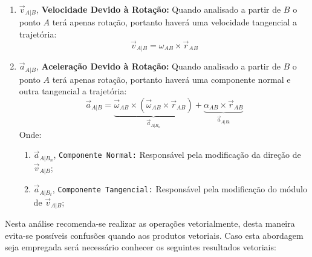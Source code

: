 \documentclass{article}
\begin{document}
                \begin{enumerate}[rightmargin = \leftmargin, noitemsep]
                    \item $\vec{v}_{A|B}$, \textbf{Velocidade Devido à Rotação:} Quando analisado a partir de $B$ o ponto $A$ terá apenas rotação, portanto haverá uma velocidade tangencial a trajetória:
                        \begin{equation}
                            \boxed{
                                \vec{v}_{A|B} = \omega_{AB}\times\vec{r}_{AB}
                            }
                        \end{equation}

                    \item $\vec{a}_{A|B}$, \textbf{Aceleração Devido à Rotação:} Quando analisado a partir de $B$ o ponto $A$ terá apenas rotação, portanto haverá uma componente normal e outra tangencial a trajetória:
                        \begin{equation}
                            \boxed{
                                \vec{a}_{A|B} = 
                                \underbrace{
                                    \vec{\omega}_{AB}\times(\vec{\omega}_{AB}\times\vec{r}_{AB})
                                }_{\vec{a}_{A|B_{n}}} + 
                                \underbrace{
                                    \alpha_{AB}\times\vec{r}_{AB}
                                }_{\vec{a}_{A|B_{t}}}
                            }
                        \end{equation}
                    Onde:
                        \begin{enumerate}[rightmargin = \leftmargin, noitemsep]
                            \item $\vec{a}_{A|B_{n}}$, \texttt{Componente Normal:} Responsável pela modificação da direção de $\vec{v}_{A|B}$;

                            \item $\vec{a}_{A|B_{t}}$, \texttt{Componente Tangencial:} Responsável pela modificação do módulo de $\vec{v}_{A|B}$;
                        \end{enumerate}
                \end{enumerate}
            Nesta análise recomenda-se realizar as operações vetorialmente, desta maneira evita-se possíveis confusões quando aos produtos vetoriais. Caso esta abordagem seja empregada será necessário conhecer os seguintes resultados vetoriais:
\end{document}
